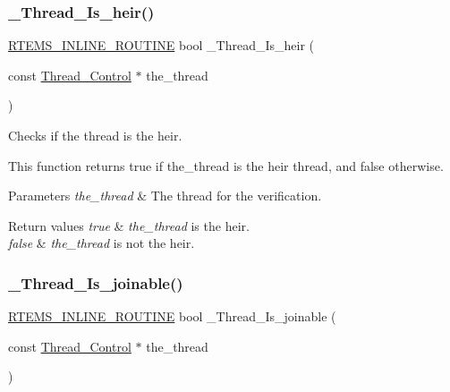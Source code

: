 \subsubsection{\texorpdfstring{\_Thread\_Is\_heir()}{\_Thread\_Is\_heir()}}
{\footnotesize\ttfamily \mbox{\hyperlink{group__RTEMSScoreBaseDefs_gac216239df231d5dbd15e3520b0b9313f}{R\+T\+E\+M\+S\+\_\+\+I\+N\+L\+I\+N\+E\+\_\+\+R\+O\+U\+T\+I\+NE}} bool \+\_\+\+Thread\+\_\+\+Is\+\_\+heir (\begin{DoxyParamCaption}\item[{const \mbox{\hyperlink{struct__Thread__Control}{Thread\+\_\+\+Control}} $\ast$}]{the\+\_\+thread }\end{DoxyParamCaption})}



Checks if the thread is the heir. 

This function returns true if the\+\_\+thread is the heir thread, and false otherwise.


\begin{DoxyParams}{Parameters}
{\em the\+\_\+thread} & The thread for the verification.\\
\hline
\end{DoxyParams}

\begin{DoxyRetVals}{Return values}
{\em true} & {\itshape the\+\_\+thread} is the heir. \\
\hline
{\em false} & {\itshape the\+\_\+thread} is not the heir. \\
\hline
\end{DoxyRetVals}
\mbox{\label{group__RTEMSScoreThread_ga7ce2f4e36ca425f2ea12da97046b9c3a}} 
\subsubsection{\texorpdfstring{\_Thread\_Is\_joinable()}{\_Thread\_Is\_joinable()}}
{\footnotesize\ttfamily \mbox{\hyperlink{group__RTEMSScoreBaseDefs_gac216239df231d5dbd15e3520b0b9313f}{R\+T\+E\+M\+S\+\_\+\+I\+N\+L\+I\+N\+E\+\_\+\+R\+O\+U\+T\+I\+NE}} bool \+\_\+\+Thread\+\_\+\+Is\+\_\+joinable (\begin{DoxyParamCaption}\item[{const \mbox{\hyperlink{struct__Thread__Control}{Thread\+\_\+\+Control}} $\ast$}]{the\+\_\+thread }\end{DoxyParamCaption})}



